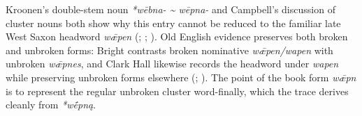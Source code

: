 \documentclass[
  british,
  a4paper,
]{article}
\begin{document}
\noindent{} \endgroup

Kroonen's double-stem noun \emph{*wēbna- \textasciitilde{} wēpna-} and
Campbell's discussion of cluster nouns both show why this entry cannot
be reduced to the familiar late West Saxon headword \emph{wǣpen}
(;
;
). Old English evidence preserves
both broken and unbroken forms: Bright contrasts broken nominative
\emph{wǣpen/wapen} with unbroken \emph{wǣpnes}, and Clark Hall likewise
records the headword under \emph{wapen} while preserving unbroken forms
elsewhere (;
). The point of the
book form \emph{wǣpn} is to represent the regular unbroken cluster
word-finally, which the trace derives cleanly from \emph{*wḗpną}.
\end{document}
